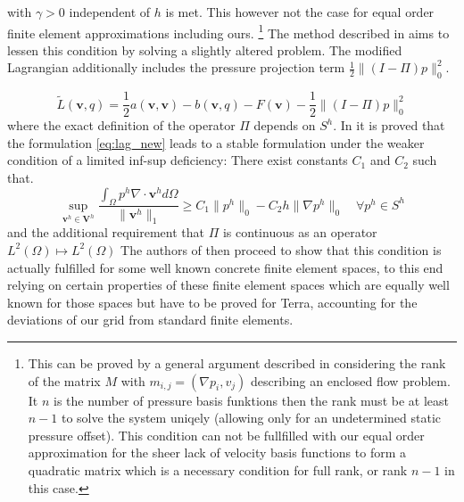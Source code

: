 \documentclass[times]{fldauth}
\newcommand{\mb}{\mathbf}
\newcommand{\bvh}{\mb v^h}
\newcommand{\bVh}{\mathbf V^h}
\begin{document}
with $\gamma > 0$ independent of $h$ is met.
This however not the case for equal order  finite element approximations including ours.
\footnote{This can be proved by a general argument described in \cite{BrezziFortin} considering the rank of the matrix $M$ with $ m_{i,j}=(\nabla p_i,v_j)$  describing an enclosed flow problem. It $n$ is the number of pressure basis funktions then the rank must be at least $n-1$ to solve the system uniqely (allowing only for an undetermined static pressure offset). This condition can not be fullfilled with our equal order approximation for the sheer lack of velocity basis functions to form a quadratic matrix which is a necessary condition for full rank, or rank $n-1$ in this case.}
The method  described in \cite{bochev2007stabilization} aims to lessen this condition by solving a slightly altered problem.
The modified Lagrangian additionally includes the pressure projection term $\frac{1}{2}\|(I-\Pi)p\|_0^2$.

\begin{equation}
\label{eq:lag_new}
\tilde L(\mb v,q) =\frac{1}{2}  a(\mb v,\mb v) -b(\mb v,q)-F(\mb v) -\frac{1}{2}\|(I-\Pi)p\|_0^2
\end{equation}
where the exact definition of the operator $\Pi$ depends on $S^h$.
In \cite{bochev2007stabilization} it is proved that the formulation \eqref{eq:lag_new} leads to a stable formulation under the weaker condition of a limited inf-sup deficiency:
There exist constants $C_1$ and $C_2$ such that.
   \begin{equation}
       \label{winf-p}
       \sup_{\bvh \in \bVh}
       \frac{	 \int_{\Omega} p^h \nabla \cdot \bvh d \Omega 	}
          {\| \bvh \|_1 }
       \geq
       C_1 \|p^h\|_0 - C_2 h \|\nabla p^h\|_0  \quad \forall p^h \in S^h
   \end{equation}
and the additional requirement that $\Pi$ is continuous as an operator $L^2(\Omega) \mapsto  L^2(\Omega) $
The authors of \cite{bochev2007stabilization} then proceed to show that this 
condition is actually fulfilled for some well known concrete finite element spaces, 
to this end relying on certain properties of these finite element spaces which are equally well known for those spaces but have to be proved for Terra,
accounting for the deviations of our grid from standard finite elements.
\end{document}
